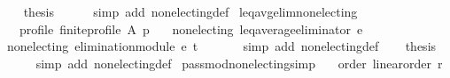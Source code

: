 \begin{isabellebody}
\ \ \isamarkupfalse%
\ {\isacharquery}{\kern0pt}thesis\isanewline
\ \ \ \ \isamarkupfalse%
\ {\isacharparenleft}{\kern0pt}simp\ add{\isacharcolon}{\kern0pt}\ non{\isacharunderscore}{\kern0pt}electing{\isacharunderscore}{\kern0pt}def{\isacharparenright}{\kern0pt}\isanewline
{}\isamarkupfalse%
%
\endisatagproof
{\isafoldproof}%
%
\isadelimproof
\isanewline
%
\endisadelimproof
\isanewline
{}\isamarkupfalse%
\ leq{\isacharunderscore}{\kern0pt}avg{\isacharunderscore}{\kern0pt}elim{\isacharunderscore}{\kern0pt}non{\isacharunderscore}{\kern0pt}electing{\isacharcolon}{\kern0pt}\isanewline
\ \ \ profile{\isacharcolon}{\kern0pt}\ {\isachardoublequoteopen}finite{\isacharunderscore}{\kern0pt}profile\ A\ p{\isachardoublequoteclose}\isanewline
\ \ \ {\isachardoublequoteopen}non{\isacharunderscore}{\kern0pt}electing\ {\isacharparenleft}{\kern0pt}leq{\isacharunderscore}{\kern0pt}average{\isacharunderscore}{\kern0pt}eliminator\ e{\isacharparenright}{\kern0pt}{\isachardoublequoteclose}\isanewline
%
\isadelimproof
%
\endisadelimproof
%
\isatagproof
{}\isamarkupfalse%
\ {\isacharminus}{\kern0pt}\isanewline
\ \ \isamarkupfalse%
\ {\isachardoublequoteopen}non{\isacharunderscore}{\kern0pt}electing\ {\isacharparenleft}{\kern0pt}elimination{\isacharunderscore}{\kern0pt}module\ e\ t\ {\isacharparenleft}{\kern0pt}{\isasymle}{\isacharparenright}{\kern0pt}{\isacharparenright}{\kern0pt}{\isachardoublequoteclose}\isanewline
\ \ \ \ \isamarkupfalse%
\ {\isacharparenleft}{\kern0pt}simp\ add{\isacharcolon}{\kern0pt}\ non{\isacharunderscore}{\kern0pt}electing{\isacharunderscore}{\kern0pt}def{\isacharparenright}{\kern0pt}\isanewline
\ \ \isamarkupfalse%
\ {\isacharquery}{\kern0pt}thesis\isanewline
\ \ \ \ \isamarkupfalse%
\ {\isacharparenleft}{\kern0pt}simp\ add{\isacharcolon}{\kern0pt}\ non{\isacharunderscore}{\kern0pt}electing{\isacharunderscore}{\kern0pt}def{\isacharparenright}{\kern0pt}\isanewline
{}\isamarkupfalse%
%
\endisatagproof
{\isafoldproof}%
%
\isadelimproof
\isanewline
%
\endisadelimproof
\isanewline
\isanewline
{}\isamarkupfalse%
\ pass{\isacharunderscore}{\kern0pt}mod{\isacharunderscore}{\kern0pt}non{\isacharunderscore}{\kern0pt}electing{\isacharbrackleft}{\kern0pt}simp{\isacharbrackright}{\kern0pt}{\isacharcolon}{\kern0pt}\isanewline
\ \ \ order{\isacharcolon}{\kern0pt}\ {\isachardoublequoteopen}linear{\isacharunderscore}{\kern0pt}order\ r{\isachardoublequoteclose}\isanewline

\end{isabellebody}
